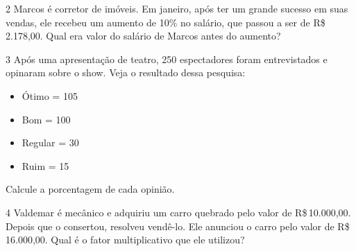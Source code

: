 \num{2} Marcos é corretor de imóveis. Em janeiro, após ter um grande sucesso
em suas vendas, ele recebeu um aumento de 10\% no salário, que passou a
ser de R\$\,2.178,00. Qual era valor do salário de Marcos antes do aumento?







\num{3} Após uma apresentação de teatro, 250 espectadores foram entrevistados
e opinaram sobre o show. Veja o resultado dessa pesquisa:

\begin{itemize}
\item
  Ótimo = 105
\item
  Bom = 100
\item
  Regular = 30
\item
  Ruim = 15
\end{itemize}

Calcule a porcentagem de cada opinião.


\num{4} Valdemar é mecânico e adquiriu um carro quebrado pelo valor de
R\$\,10.000,00. Depois que o consertou, resolveu vendê-lo. Ele anunciou o
carro pelo valor de R\$\,16.000,00. Qual é o fator multiplicativo que ele
utilizou?







